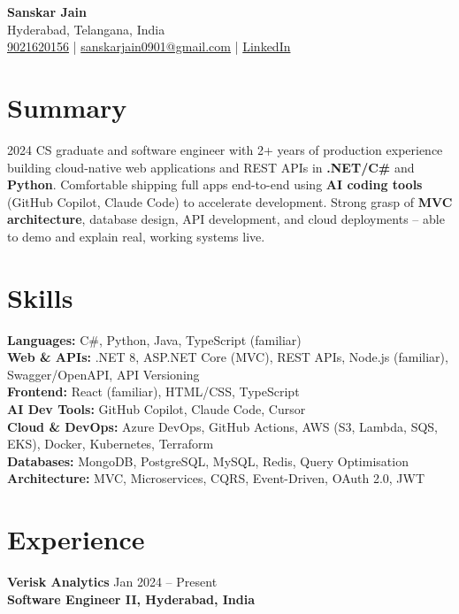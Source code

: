 \documentclass[letterpaper,10pt]{article}
\begin{document}
\begin{center}
    {\LARGE \textbf{Sanskar Jain}} \\
    Hyderabad, Telangana, India \\
    \href{tel:9021620156}{9021620156} \;|\;
    \href{mailto:sanskarjain0901@gmail.com}{sanskarjain0901@gmail.com} \;|\;
    \href{https://www.linkedin.com/in/sanskar-jain0901/}{LinkedIn}
\end{center}

\vspace{3pt}

\section*{Summary}
2024 CS graduate and software engineer with 2+ years of production experience building cloud-native web applications and REST APIs in \textbf{.NET/C\#} and \textbf{Python}.
Comfortable shipping full apps end-to-end using \textbf{AI coding tools} (GitHub Copilot, Claude Code) to accelerate development.
Strong grasp of \textbf{MVC architecture}, database design, API development, and cloud deployments -- able to demo and explain real, working systems live.

\section*{Skills}
\textbf{Languages:} C\#, Python, Java, TypeScript (familiar) \\
\textbf{Web \& APIs:} .NET 8, ASP.NET Core (MVC), REST APIs, Node.js (familiar), Swagger/OpenAPI, API Versioning \\
\textbf{Frontend:} React (familiar), HTML/CSS, TypeScript \\
\textbf{AI Dev Tools:} GitHub Copilot, Claude Code, Cursor \\
\textbf{Cloud \& DevOps:} Azure DevOps, GitHub Actions, AWS (S3, Lambda, SQS, EKS), Docker, Kubernetes, Terraform \\
\textbf{Databases:} MongoDB, PostgreSQL, MySQL, Redis, Query Optimisation \\
\textbf{Architecture:} MVC, Microservices, CQRS, Event-Driven, OAuth 2.0, JWT

\section*{Experience}

\textbf{Verisk Analytics} \hfill Jan 2024 -- Present \\
\textbf{Software Engineer II, Hyderabad, India}
\end{document}
